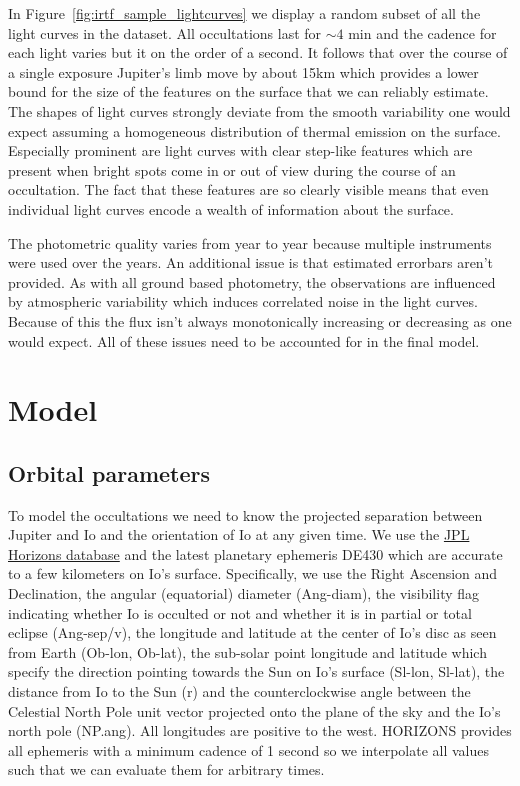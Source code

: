\documentclass[modern]{aastex62}
\begin{document}
In Figure~\ref{fig:irtf_sample_lightcurves} we display a random subset of all the light curves
in the dataset.
All occultations last for $\sim4$ min and the cadence for each light varies but it on the order of a second.
It follows that over the course of a single exposure Jupiter's limb move by about 15km which provides a lower bound for the size of the features on the surface that we can reliably estimate.
The shapes of light curves strongly deviate from the smooth variability one would expect assuming a homogeneous distribution of thermal emission on the surface.
Especially prominent are light curves with clear step-like features which are present when bright spots come in or out of view during the course of an occultation.
The fact that these features are so clearly visible means that even individual light curves encode a wealth of information about the surface.

The photometric quality varies from year to year because multiple instruments were used over the years.
An additional issue is that estimated errorbars aren't provided.
As with all ground based photometry, the observations are influenced by atmospheric variability which induces correlated noise in the light curves.
Because of this the flux isn't always monotonically increasing or decreasing as one would expect.
All of these issues need to be accounted for in the final model.

\section{Model}
\label{sec:model}
\subsection{Orbital parameters}
\label{ssec:orbital_parameters}
To model the occultations we need to know the projected separation between Jupiter and Io and the orientation of Io at any given time.
We use the \href{https://ssd.jpl.nasa.gov/horizons.cgi}{JPL Horizons database} and the latest planetary ephemeris DE430 \citep{folkner_planetary_2014} which are accurate to a few kilometers on Io's surface.
Specifically, we use the Right Ascension and Declination, the angular (equatorial) diameter (\textsf{Ang-diam}), the visibility flag indicating whether Io is occulted or not and whether it is in partial or total eclipse (\textsf{Ang-sep/v}), the longitude and latitude at the center of Io's disc as seen from Earth (\textsf{Ob-lon}, \textsf{Ob-lat}), the sub-solar point longitude and latitude which specify the direction pointing towards the Sun on Io's surface (\textsf{Sl-lon}, \textsf{Sl-lat}), the distance from Io to the Sun (\textsf{r}) and
the counterclockwise angle between the Celestial North Pole unit vector projected onto the plane of the sky and the Io's north pole (\textsf{NP.ang}).
All longitudes are positive to the west.
\textsf{HORIZONS} provides all ephemeris with a minimum cadence of 1 second so we interpolate all values such that we can evaluate them for arbitrary times.
\end{document}
